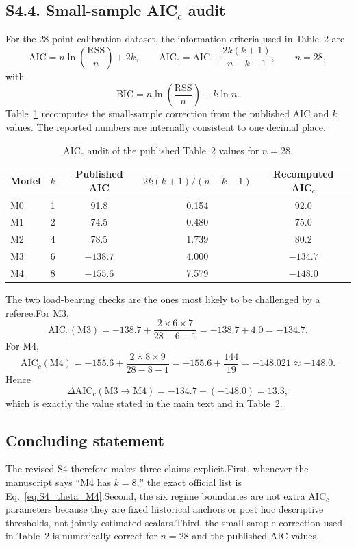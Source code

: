 \documentclass[11pt]{article}
\begin{document}
\subsection*{S4.4. Small-sample AIC$_c$ audit}\label{subsec:S4_AICc_audit}
For the 28-point calibration dataset, the information criteria used in Table~2 are
\begin{equation}\mathrm{AIC}=n\ln\!\left(\frac{\mathrm{RSS}}{n}\right)+2k,\qquad\mathrm{AIC}_c=\mathrm{AIC}+\frac{2k(k+1)}{n-k-1},\qquad n=28,\tag{S4.6}\label{eq:S4_AICc}\end{equation}
with
\begin{equation}\mathrm{BIC}=n\ln\!\left(\frac{\mathrm{RSS}}{n}\right)+k\ln n.\tag{S4.7}\label{eq:S4_BIC}\end{equation}
Table~\ref{tab:S4_AICc_audit} recomputes the small-sample correction from the published AIC and $k$values. The reported numbers are internally consistent to one decimal place.\begin{table}[H]\centering\caption{AIC$_c$ audit of the published Table~2 values for $n=28$.}\label{tab:S4_AICc_audit}\begin{tabular}{lcccc}\toprule
Model & $k$ & Published AIC & $2k(k+1)/(n-k-1)$ & Recomputed AIC$_c$ \\\midrule
M0 & 1 & 91.8 & 0.154 & 92.0 \\M1 & 2 & 74.5 & 0.480 & 75.0 \\M2 & 4 & 78.5 & 1.739 & 80.2 \\M3 & 6 & $-138.7$ & 4.000 & $-134.7$ \\M4 & 8 & $-155.6$ & 7.579 & $-148.0$ \\\bottomrule
\end{tabular}\end{table}
The two load-bearing checks are the ones most likely to be challenged by a referee.For M3,
\[\mathrm{AIC}_c(\mathrm{M3})=-138.7+\frac{2\times 6\times 7}{28-6-1}=-138.7+4.0=-134.7.\]
For M4,
\[\mathrm{AIC}_c(\mathrm{M4})=-155.6+\frac{2\times 8\times 9}{28-8-1}=-155.6+\frac{144}{19}=-148.021\approx -148.0.\]
Hence
\begin{equation}\Delta\mathrm{AIC}_c(\mathrm{M3}\to\mathrm{M4})=-134.7-(-148.0)=13.3,\tag{S4.8}\label{eq:S4_deltaAICc}\end{equation}
which is exactly the value stated in the main text and in Table~2.
\subsection*{Concluding statement}\label{subsec:S4_conclusion}
The revised S4 therefore makes three claims explicit.First, whenever the manuscript says ``M4 has $k=8$,'' the exact official list is Eq.~\eqref{eq:S4_theta_M4}.Second, the six regime boundaries are not extra AIC$_c$ parameters because they are fixed historical anchors or post hoc descriptive thresholds, not jointly estimated scalars.Third, the small-sample correction used in Table~2 is numerically correct for $n=28$ and the published AIC values.
\end{document}
